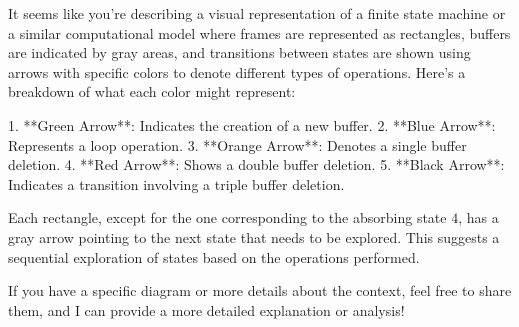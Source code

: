 It seems like you're describing a visual representation of a finite state machine or a similar computational model where frames are represented as rectangles, buffers are indicated by gray areas, and transitions between states are shown using arrows with specific colors to denote different types of operations. Here's a breakdown of what each color might represent:

1. **Green Arrow**: Indicates the creation of a new buffer.
2. **Blue Arrow**: Represents a loop operation.
3. **Orange Arrow**: Denotes a single buffer deletion.
4. **Red Arrow**: Shows a double buffer deletion.
5. **Black Arrow**: Indicates a transition involving a triple buffer deletion.

Each rectangle, except for the one corresponding to the absorbing state \(4\), has a gray arrow pointing to the next state that needs to be explored. This suggests a sequential exploration of states based on the operations performed.

If you have a specific diagram or more details about the context, feel free to share them, and I can provide a more detailed explanation or analysis!